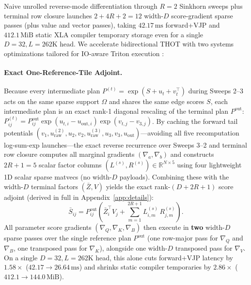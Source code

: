 \documentclass[11pt]{article}
\begin{document}
Naive unrolled reverse-mode differentiation through $R=2$ Sinkhorn sweeps plus terminal row closure launches $2 + 4R + 2 = 12$ width-$D$ score-gradient sparse passes (plus value and vector passes), taking $42.17\,\text{ms}$ forward+VJP and $412.1\,\text{MiB}$ static XLA compiler temporary storage even for a single $D=32, L=262\text{K}$ head. We accelerate bidirectional THOT with two systems optimizations tailored for IO-aware Triton execution \citep{triton2019tillet,flashsinkhorn2026}:

\paragraph{Exact One-Reference-Tile Adjoint.}
Because every intermediate plan $P^{(t)} = \exp(S + u_t + v_t^\top)$ during Sweeps 2--3 acts on the same sparse support $\Omega$ and shares the same edge scores $S$, each intermediate plan is an exact rank-1 diagonal rescaling of the terminal plan $P^{\text{out}}$:
$P^{(t)}_{ij} = P^{\text{out}}_{ij} \exp(u_{t,i} - u_{\text{out},i}) \exp(v_{t,j} - v_{3,j})$.
By caching the forward tail potentials $(v_1, u^{(2)}_{\text{raw}}, u_2, v_2, u^{(3)}_{\text{raw}}, u_3, v_3, u_{\text{out}})$---avoiding all five recomputation log-sum-exp launches---the exact reverse recurrence over Sweeps 3--2 and terminal row closure computes all marginal gradients $(\nabla_a, \nabla_b)$ and constructs $2R+1 = 5$ scalar factor columns $(L^{(s)}, R^{(s)}) \in \mathbb{R}^{N \times 5}$ using four lightweight 1D scalar sparse matvecs (no width-$D$ payloads). Combining these with the width-$D$ terminal factors $(\bar{Z}, V)$ yields the exact rank-$(D+2R+1)$ score adjoint (derived in full in Appendix~\ref{app:details}):
\begin{equation}
  \bar{S}_{ij} = P^{\text{out}}_{ij} \left( \bar{Z}_i^\top V_j + \sum_{m=1}^{2R+1} L^{(s)}_{i,m}\, R^{(s)}_{j,m} \right).
  \label{eq:one-ref-score-main}
\end{equation}
All parameter score gradients $(\nabla_Q, \nabla_K, \nabla_B)$ then execute in \textbf{two} width-$D$ sparse passes over the single reference plan $P^{\text{out}}$ (one row-major pass for $\nabla_Q$ and $\nabla_B$, one transposed pass for $\nabla_K$), alongside one width-$D$ transposed pass for $\nabla_V$. On a single $D=32, L=262\text{K}$ head, this alone cuts forward+VJP latency by $1.58\times$ ($42.17 \to 26.64\,\text{ms}$) and shrinks static compiler temporaries by $2.86\times$ ($412.1 \to 144.0\,\text{MiB}$).
\end{document}

